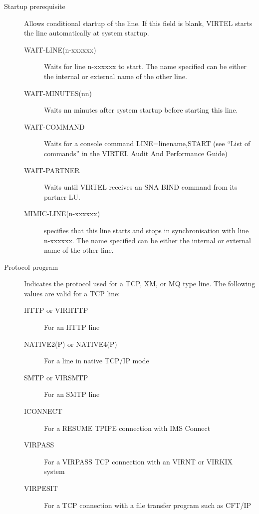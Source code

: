 \documentclass[letterpaper,10pt,english]{sphinxmanual}
\begin{document}
\begin{description}
\item[{Startup prerequisite}] \leavevmode
Allows conditional startup of the line. If this field is blank,
VIRTEL starts the line automatically at system startup.
\begin{description}
\item[{WAIT-LINE(n-xxxxxx)}] \leavevmode
Waits for line n-xxxxxx to start. The name specified can be either
the internal or external name of the other line.

\item[{WAIT-MINUTES(nn)}] \leavevmode
Waits nn minutes after system startup before starting this line.

\item[{WAIT-COMMAND}] \leavevmode
Waits for a console command LINE=linename,START (see “List of
commands” in the VIRTEL Audit And Performance Guide)

\item[{WAIT-PARTNER}] \leavevmode
Waits until VIRTEL receives an SNA BIND command from its partner LU.

\item[{MIMIC-LINE(n-xxxxxx)}] \leavevmode
specifies that this line starts and stops in synchronisation with
line n-xxxxxx. The name specified can be either the internal or
external name of the other line.

\end{description}

\item[{Protocol program}] \leavevmode
Indicates the protocol used for a TCP, XM, or MQ type line. The
following values are valid for a TCP line:
\begin{description}
\item[{HTTP or VIRHTTP}] \leavevmode
For an HTTP line

\item[{NATIVE2(P) or NATIVE4(P)}] \leavevmode
For a line in native TCP/IP mode

\item[{SMTP or VIRSMTP}] \leavevmode
For an SMTP line

\item[{ICONNECT}] \leavevmode
For a RESUME TPIPE connection with IMS Connect

\item[{VIRPASS}] \leavevmode
For a VIRPASS TCP connection with an VIRNT or VIRKIX system

\item[{VIRPESIT}] \leavevmode
For a TCP connection with a file transfer program such as CFT/IP


\end{description}
\end{description}
\end{document}
